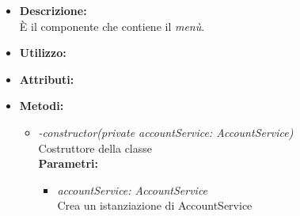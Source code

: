 \begin{itemize}
	\item \textbf{Descrizione:}\\
	È il componente che contiene il \textit{menù}.
	\item \textbf{Utilizzo:}\\
	
	\item \textbf{Attributi:}
		
	\item \textbf{Metodi:}
		\begin{itemize}
			\item \emph{-constructor(private accountService: AccountService)}\\
    		Costruttore della classe\\
    		\textbf{Parametri:}
    		\begin{itemize}
    			\item \emph{accountService: AccountService}\\
    			Crea un istanziazione di AccountService
    		\end{itemize}
		\end{itemize}
\end{itemize}